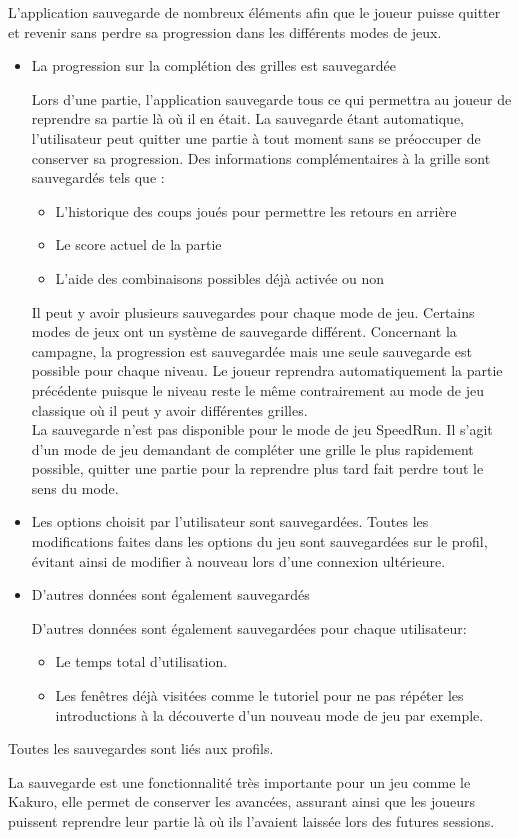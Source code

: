 {
    L'application sauvegarde de nombreux éléments afin que le joueur puisse quitter et revenir sans perdre sa progression dans les différents modes de jeux.
    \begin{itemize}
        \item {}
            {La progression sur la complétion des grilles est sauvegardée}
            {
                Lors d'une partie, l'application sauvegarde tous ce qui permettra au joueur de reprendre sa partie là où il en était. La sauvegarde étant automatique, l'utilisateur peut quitter une partie à tout moment sans se préoccuper de conserver sa progression. Des informations complémentaires à la grille sont sauvegardés tels que :
                \noexpand\begin{itemize}
                    \noexpand\item L'historique des coups joués pour permettre les retours en arrière
                    \noexpand\item Le score actuel de la partie
                    \noexpand\item L'aide des combinaisons possibles déjà activée ou non
                \noexpand\end{itemize}
                Il peut y avoir plusieurs sauvegardes pour chaque mode de jeu.
                Certains modes de jeux ont un système de sauvegarde différent. Concernant la campagne, la progression est sauvegardée mais une seule sauvegarde est possible pour chaque niveau. Le joueur reprendra automatiquement la partie précédente puisque le niveau reste le même contrairement au mode de jeu classique où il peut y avoir différentes grilles.
                \\
                La sauvegarde n'est pas disponible pour le mode de jeu SpeedRun. Il s'agit d'un mode de jeu demandant de compléter une grille le plus rapidement possible, quitter une partie pour la reprendre plus tard fait perdre tout le sens du mode.
            }
        \item {}
            {Les options choisit par l'utilisateur sont sauvegardées.}
            {
                Toutes les modifications faites dans les options du jeu sont sauvegardées sur le profil, évitant ainsi de modifier à nouveau lors d'une connexion ultérieure.
            }
        \item {}
            {D'autres données sont également sauvegardés}
            {
                D'autres données sont également sauvegardées pour chaque utilisateur:
                \noexpand\begin{itemize}
                    \noexpand\item Le temps total d'utilisation.
                    \noexpand\item Les fenêtres déjà visitées comme le tutoriel pour ne pas répéter les introductions à la découverte d'un nouveau mode de jeu par exemple.
                \noexpand\end{itemize}
            }
    \end{itemize}
    Toutes les sauvegardes sont liés aux profils.
}
{
    La sauvegarde est une fonctionnalité très importante pour un jeu comme le Kakuro, elle permet de conserver les avancées, assurant ainsi que les joueurs puissent reprendre leur partie là où ils l'avaient laissée lors des futures sessions.
}